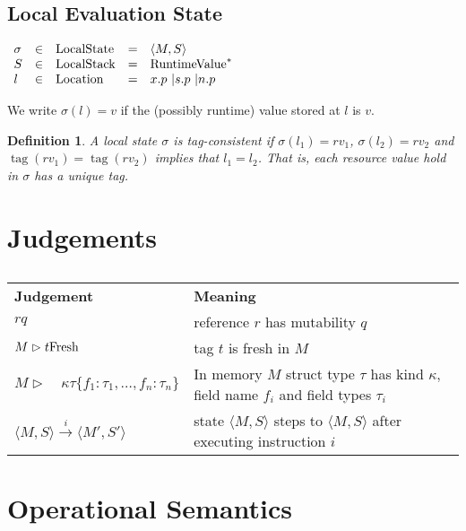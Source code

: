 \documentclass{article}
\newcommand{\tmop}[1]{\ensuremath{\operatorname{#1}}}
\newcommand{\tmstrong}[1]{\textbf{#1}}
\newcommand{\tmxspace}{\hspace{1em}}
\newtheorem{definition}{Definition}
\begin{document}
\subsection{Local Evaluation State}

$\begin{array}{lllll}
  \sigma & \in & \tmop{LocalState} & = & \langle M, S \rangle\\
  S & \in & \tmop{LocalStack} & = & \tmop{RuntimeValue}^{\ast}\\
  l & \in & \tmop{Location} & = & \text{$x.p$ \textbar $s.p$ \textbar $n.p$ }
\end{array}$

We write $\sigma (l) = v$ if the (possibly runtime) value stored at $l$ is
$v$.

\begin{definition}
  A local state $\sigma$ is tag-consistent if $\sigma (l_1) = r v_1$, $\sigma
  (l_2) = r v_2$ and $\tmop{tag} (r v_1) = \tmop{tag} (r v_2)$ implies that
  $l_1 = l_2$. That is, each resource value hold in $\sigma$ has a unique tag.
\end{definition}

\section{Judgements}

\begin{table}[h]
  \begin{tabular}{ll}
    {\tmstrong{Judgement}} & {\tmstrong{Meaning}}\\
    $r q$ & reference $r$ has mutability $q$\\
    $M \vartriangleright t \tmstrong{\tmop{Fresh}}$ & tag $t$ is fresh in
    $M$\\
    $M \vartriangleright \tmxspace \kappa \tau \{ f_1 : \tau_1, \ldots, f_n :
    \tau_n \}$ & In memory $M$ struct type $\tau$ has kind $\kappa$, field
    name $f_i$ and field types $\tau_i$\\
    $\langle M, S \rangle \xrightarrow{i} \langle M', S' \rangle$ & state
    $\langle M, S \rangle$ steps to $\langle M, S \rangle$ after executing
    instruction $i$
  \end{tabular}
  \caption{}
\end{table}

\section{Operational Semantics}
\end{document}
